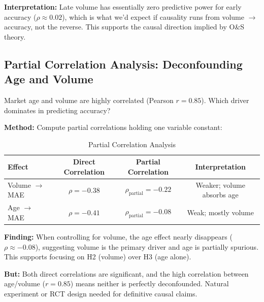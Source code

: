 \documentclass[12pt,letterpaper]{article}
\begin{document}
\textbf{Interpretation:} Late volume has essentially zero predictive power for early accuracy ($\rho \approx 0.02$), which is what we'd expect if causality runs from volume $\rightarrow$ accuracy, not the reverse. This supports the causal direction implied by O\&S theory.

\subsection{Partial Correlation Analysis: Deconfounding Age and Volume}

Market age and volume are highly correlated (Pearson $r = 0.85$). Which driver dominates in predicting accuracy?

\textbf{Method:} Compute partial correlations holding one variable constant:

\begin{table}[ht]
\centering
\caption{Partial Correlation Analysis}
\label{tab:partial}
\begin{tabular}{lccc}
\toprule
\textbf{Effect} & \textbf{Direct Correlation} & \textbf{Partial Correlation} & \textbf{Interpretation} \\
\midrule
Volume $\rightarrow$ MAE & $\rho = -0.38$ & $\rho_{\text{partial}} = -0.22$ & Weaker; volume absorbs age \\
Age $\rightarrow$ MAE & $\rho = -0.41$ & $\rho_{\text{partial}} = -0.08$ & Weak; mostly volume \\
\bottomrule
\end{tabular}
\end{table}

\textbf{Finding:} When controlling for volume, the age effect nearly disappears ($\rho \approx -0.08$), suggesting volume is the primary driver and age is partially spurious. This supports focusing on H2 (volume) over H3 (age alone).

\textbf{But:} Both direct correlations are significant, and the high correlation between age/volume ($r = 0.85$) means neither is perfectly deconfounded. Natural experiment or RCT design needed for definitive causal claims.
\end{document}
